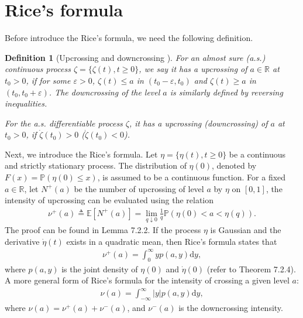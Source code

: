 \documentclass[12pt]{article}
\numberwithin{equation}{section}
\newtheorem{definition}[theorem]{Definition}
\def \R{\mathbb R}
\def \E{\mathbb E}
\def \P{\mathbb P}
\def\d{\mathrm{d}}
\begin{document}
\section{Rice's formula}\label{app-A03}
\setcounter{equation}{0}
\renewcommand{\theequation}{C.\arabic{equation}}
\renewcommand{\thedefinition}{C.\arabic{definition}}
\setcounter{figure}{0}
\renewcommand{\thefigure}{C-\arabic{figure}}

Before introduce the Rice's formula, we need the following definition. 
\begin{definition}[Upcrossing and downcrossing \cite{L66}]
	For an almost sure (a.s.) continuous process $\zeta = \{\zeta(t), t\geq 0\}$, 
	we say it has a upcrossing of $a\in\R$ at $t_{0}>0$, 
	if for some $\varepsilon>0$, $\zeta(t)\leq a$ in $(t_{0}-\varepsilon, t_{0})$ and 
	$\zeta(t) \geq a$ in $(t_{0}, t_{0}+\varepsilon)$. 
	The downcrossing of the level $a$ is similarly defined by reversing inequalities. 
	
	For the a.s. differentiable process $\zeta$, it has a upcrossing (downcrossing) of $a$ at $t_{0}>0$, 
	if $\dot{\zeta}(t_{0}) > 0$ ($\dot{\zeta}(t_{0}) < 0$).  
\end{definition}

Next, we introduce the Rice's formula. 
Let $\eta = \{\eta(t), t\geq 0\}$ be a continuous and strictly stationary process. 
The distribution of $\eta(0)$, denoted by $F(x) = \P(\eta(0)\leq x)$, 
is assumed to be a continuous function. 
For a fixed $a\in \R$, let $N^{+}(a)$ be the number of upcrossing of level $a$ by $\eta$ on $[0,1]$, 
the intensity of upcrossing can be evaluated using the relation 
\begin{align*}
	\nu^{+}(a) \triangleq \E[N^{+}(a)] = \lim_{q\downarrow 0}\frac{1}{q}\P(\eta(0) < a < \eta(q)).
\end{align*}
The proof can be found in \cite{LLR83} Lemma 7.2.2. 
If the process $\eta$ is Gaussian and the derivative $\dot{\eta}(t)$ exists in a quadratic mean, 
then Rice's formula states that 
\begin{align*}
	\nu^{+}(a) = \int_{0}^{\infty} y p(a,y)\d y,
\end{align*}
where $p(a,y)$ is the joint density of $\eta(0)$ and $\dot{\eta}(0)$ (refer to \cite{LLR83} Theorem 7.2.4). 
A more general form of Rice's formula for the intensity of crossing a given level $a$:
\begin{align*}
	\nu(a) = \int_{-\infty}^{\infty} |y| p(a,y)\d y,
\end{align*}
where $\nu(a) = \nu^{+}(a) + \nu^{-}(a)$, and $ \nu^{-}(a)$ is the downcrossing intensity. 
\end{document}
